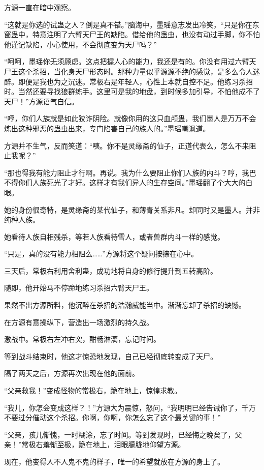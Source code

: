 \begin{this_body}
方源一直在暗中观察。

“这就是你选的试蛊之人？倒是真不错。”脑海中，墨瑶意志发出冷笑，“只是你在东窗蛊中，特意注明了六臂天尸王的缺陷。借给他的蛊虫，也没有动过手脚，你不怕他谨记缺陷，小心使用，不会彻底变为天尸吗？”

“呵呵，墨瑶你无须顾虑。这点把握人心的能力，我还是有的。你没有用过六臂天尸王这个杀招，当化身天尸形态时。那种力量似乎源源不绝的感觉，是多么令人迷醉。即便是我也为之沉迷。常极右是年轻人，心性上本就自控不足。他练习杀招时。当然还要寻找狼群练手。这里可是我的地盘，到时候多加引导，不怕他成不了天尸！”方源语气自信。

“哼，你们人族就是如此狡诈阴险。就像你用的这只血颅蛊，我们墨人是万万不会炼出这种邪恶的蛊虫出来，专门陷害自己的族人的。”墨瑶嘲讽道。

方源并不生气，反而笑道：“咦。你不是灵缘斋的仙子，正道代表么，怎么不来阻止我呢？”

“那也得我有能力阻止才行啊。再说。我为什么要阻止你们人族的内斗？哼，我巴不得你们人族死光了才好。这样才有我们异人的生存空间。”墨瑶翻了个大大的白眼。

她的身份很奇特，是灵缘斋的某代仙子，和薄青关系非凡。却同时又是墨人。并非纯种人族。

她看待人族自相残杀，等若人族看待雪人，或者兽群内斗一样的感觉。

“只是，真的没有能力相阻么……”方源将这个疑问按捺在心中。

三天后，常极右利用舍利蛊，成功地将自身的修行提升到五转高阶。

随即，他开始马不停蹄地练习杀招六臂天尸王。

果然不出方源所料，他沉醉在杀招的浩瀚威能当中。渐渐忘却了杀招的缺憾。

在方源有意操纵下，营造出一场激烈的持久战。

激战中。常极右左冲右突，酣畅淋漓，忘记时间。

等到战斗结束时，他这才惊恐地发现，自己已经彻底转变成了天尸。

隔了两天之后，方源再次出现在他的面前。

“父亲救我！”变成怪物的常极右，跪在地上，惊惶求教。

“我儿，你怎会变成这样？！”方源大为震惊，怒问，“我明明已经告诫你了，千万不要过分催动这个杀招。你啊，你啊，你怎么忘了这个最关键的事！”

“父亲，孩儿惭愧，一时糊涂，忘了时间。等到发现时，已经悔之晚矣了，父亲！”常极右羞惭至极，跪在地上，泪眼朦胧地仰望方源。

现在，他变得人不人鬼不鬼的样子，唯一的希望就放在方源的身上了。


\end{this_body}
